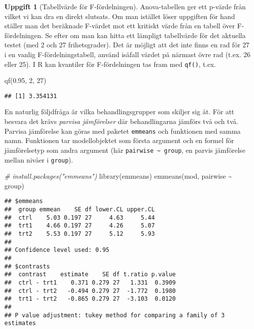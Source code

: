 \documentclass[
]{book}
\newenvironment{Shaded}{\begin{snugshade}}{\end{snugshade}}
\newcommand{\CommentTok}[1]{\textcolor[rgb]{0.56,0.35,0.01}{\textit{#1}}}
\newcommand{\DecValTok}[1]{\textcolor[rgb]{0.00,0.00,0.81}{#1}}
\newcommand{\FloatTok}[1]{\textcolor[rgb]{0.00,0.00,0.81}{#1}}
\newcommand{\FunctionTok}[1]{\textcolor[rgb]{0.00,0.00,0.00}{#1}}
\newcommand{\NormalTok}[1]{#1}
\newcommand{\SpecialCharTok}[1]{\textcolor[rgb]{0.00,0.00,0.00}{#1}}
\theoremstyle{definition}
\theoremstyle{definition}
\theoremstyle{definition}
\newtheorem{exercise}{Uppgift}[chapter]
\theoremstyle{definition}
\theoremstyle{remark}
\begin{document}
\begin{exercise}[Tabellvärde för F-fördelningen]

Anova-tabellen ger ett p-värde från vilket vi kan dra en direkt slutsats. Om man istället löser uppgiften för hand ställer man det beräknade F-värdet mot ett kritiskt värde från en tabell över F-fördelningen. Se efter om man kan hitta ett lämpligt tabellvärde för det aktuella testet (med 2 och 27 frihetsgrader). Det är möjligt att det inte finns en rad för 27 i en vanlig F-fördelningstabell, använd isåfall värdet på närmast övre rad (t.ex. 26 eller 25). I R kan kvantiler för F-fördelningen tas fram med \texttt{qf()}, t.ex.

\begin{Shaded}
\begin{Highlighting}[]
\FunctionTok{qf}\NormalTok{(}\FloatTok{0.95}\NormalTok{, }\DecValTok{2}\NormalTok{, }\DecValTok{27}\NormalTok{)}
\end{Highlighting}
\end{Shaded}

\begin{verbatim}
## [1] 3.354131
\end{verbatim}

\end{exercise}

En naturlig följdfråga är vilka behandlingsgrupper som skiljer sig åt. För att besvara det krävs \emph{parvisa jämförelser} där behandlingarna jämförs två och två. Parvisa jämförelse kan göras med paketet \texttt{emmeans} och funktionen med samma namn. Funktionen tar modellobjektet som första argument och en formel för jämförelsetyp som andra argument (här \texttt{pairwise\ \textasciitilde{}\ group}, en parvis jämförelse mellan nivåer i \texttt{group}).

\begin{Shaded}
\begin{Highlighting}[]
\CommentTok{\# install.packages("emmeans")}
\FunctionTok{library}\NormalTok{(emmeans)}
\FunctionTok{emmeans}\NormalTok{(mod, pairwise }\SpecialCharTok{\textasciitilde{}}\NormalTok{ group)}
\end{Highlighting}
\end{Shaded}

\begin{verbatim}
## $emmeans
##  group emmean    SE df lower.CL upper.CL
##  ctrl    5.03 0.197 27     4.63     5.44
##  trt1    4.66 0.197 27     4.26     5.07
##  trt2    5.53 0.197 27     5.12     5.93
## 
## Confidence level used: 0.95 
## 
## $contrasts
##  contrast    estimate    SE df t.ratio p.value
##  ctrl - trt1    0.371 0.279 27   1.331  0.3909
##  ctrl - trt2   -0.494 0.279 27  -1.772  0.1980
##  trt1 - trt2   -0.865 0.279 27  -3.103  0.0120
## 
## P value adjustment: tukey method for comparing a family of 3 estimates
\end{verbatim}
\end{document}
